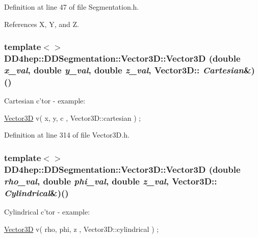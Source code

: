 Definition at line 47 of file Segmentation.h.

References X, Y, and Z.\hypertarget{struct_d_d4hep_1_1_d_d_segmentation_1_1_vector3_d_adc2c2cbe8343822700e3063de9782140}{
\subsubsection[{Vector3D}]{\setlength{\rightskip}{0pt plus 5cm}template$<$$>$ DD4hep::DDSegmentation::Vector3D::Vector3D (double {\em x\_\-val}, \/  double {\em y\_\-val}, \/  double {\em z\_\-val}, \/  Vector3D:: {\em Cartesian}\&)()}}
\label{struct_d_d4hep_1_1_d_d_segmentation_1_1_vector3_d_adc2c2cbe8343822700e3063de9782140}
Cartesian c'tor -\/ example: \par
 \hyperlink{struct_d_d4hep_1_1_d_d_segmentation_1_1_vector3_d}{Vector3D} v( x, y, c , Vector3D::cartesian ) ; 

Definition at line 314 of file Vector3D.h.\hypertarget{struct_d_d4hep_1_1_d_d_segmentation_1_1_vector3_d_aa8a30ee863297b55f42329988d2481e8}{
\subsubsection[{Vector3D}]{\setlength{\rightskip}{0pt plus 5cm}template$<$$>$ DD4hep::DDSegmentation::Vector3D::Vector3D (double {\em rho\_\-val}, \/  double {\em phi\_\-val}, \/  double {\em z\_\-val}, \/  Vector3D:: {\em Cylindrical}\&)()}}
\label{struct_d_d4hep_1_1_d_d_segmentation_1_1_vector3_d_aa8a30ee863297b55f42329988d2481e8}
Cylindrical c'tor -\/ example: \par
 \hyperlink{struct_d_d4hep_1_1_d_d_segmentation_1_1_vector3_d}{Vector3D} v( rho, phi, z , Vector3D::cylindrical ) ; 

